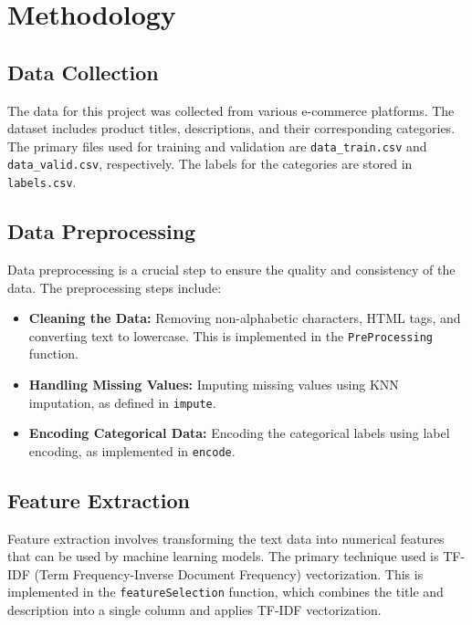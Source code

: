 \documentclass[10pt]{article}
\begin{document}
\section{Methodology}

\subsection{Data Collection}
The data for this project was collected from various e-commerce platforms. The dataset includes product titles, descriptions, and their corresponding categories. The primary files used for training and validation are \texttt{data\_train.csv} and \texttt{data\_valid.csv}, respectively. The labels for the categories are stored in \texttt{labels.csv}.

\subsection{Data Preprocessing}
Data preprocessing is a crucial step to ensure the quality and consistency of the data. The preprocessing steps include:
\begin{itemize}
    \item \textbf{Cleaning the Data:} Removing non-alphabetic characters, HTML tags, and converting text to lowercase. This is implemented in the \texttt{PreProcessing} function.
    \item \textbf{Handling Missing Values:} Imputing missing values using KNN imputation, as defined in \texttt{impute}.
    \item \textbf{Encoding Categorical Data:} Encoding the categorical labels using label encoding, as implemented in \texttt{encode}.
\end{itemize}

\subsection{Feature Extraction}
Feature extraction involves transforming the text data into numerical features that can be used by machine learning models. The primary technique used is TF-IDF (Term Frequency-Inverse Document Frequency) vectorization. This is implemented in the \texttt{featureSelection} function, which combines the title and description into a single column and applies TF-IDF vectorization.
\end{document}
